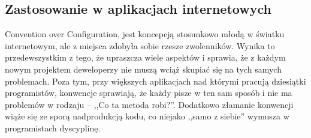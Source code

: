 \documentclass[a4paper,12pt,oneside]{report}
\begin{document}
\subsection{Zastosowanie w aplikacjach internetowych}
\label{coc:web}
Convention over Configuration, jest koncepcją stosunkowo młodą w światku internetowym, ale z miejsca zdobyła sobie rzesze zwolenników. Wynika to przedewszystkim z tego, że upraszcza wiele aspektów i sprawia, że z każdym nowym projektem deweloperzy nie muszą wciąż skupiać się na tych samych problemach. Poza tym, przy większych aplikacjach nad którymi pracują dziesiątki programistów, konwencje sprawiają, że każdy pisze w ten sam sposób i nie ma problemów w rodzaju -- ,,Co ta metoda robi?''. Dodatkowo złamanie konwencji wiąże się ze sporą nadprodukcją kodu, co niejako ,,samo z siebie'' wymusza w programistach dyscyplinę.
\end{document}
